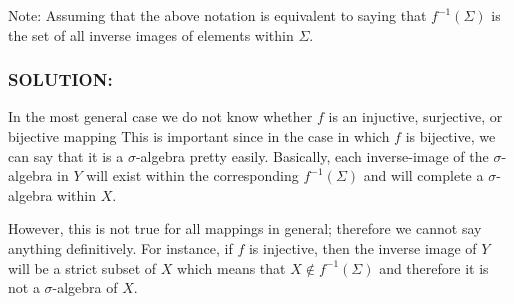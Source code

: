 \documentclass[]{article}
\newcommand{\Solution}{\subsubsection*{\textbf{SOLUTION:}}}
\newcommand{\Preliminaries}{\subsubsection*{\textbf{PRELIMINARIES:}}}
\begin{document}
Note: 
Assuming that the above notation is equivalent to saying that $f^{-1}(\Sigma)$ is the set of all inverse images of elements within $\Sigma$.


\Solution
In the most general case we do not know whether $f$ is an injuctive, surjective, or bijective mapping
This is important since in the case in which $f$ is bijective, we can say that it is a $\sigma$-algebra pretty easily. 
Basically, each inverse-image of the $\sigma$-algebra in $Y$ will exist within the corresponding $f^{-1}(\Sigma)$ and will complete a $\sigma$-algebra within $X$.

However, this is not true for all mappings in general; therefore we cannot say anything definitively. 
For instance, if $f$ is injective, then the inverse image of $Y$ will be a strict subset of $X$ which means that $X \notin f^{-1}(\Sigma)$ and therefore it is not a $\sigma$-algebra of $X$.
\end{document}
